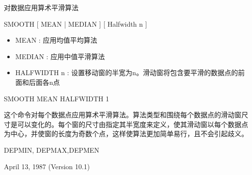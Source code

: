 \label{cmd:smooth}

对数据应用算术平滑算法

SMOOTH [ MEAN | MEDIAN ] [ Halfwidth n ]

\begin{itemize}
\item MEAN : 应用均值平均算法 
\item MEDIAN : 应用中值平滑算法 
\item HALFWIDTH n : 设置移动窗的半宽为n。滑动窗将包含要平滑的数据点的前面和后面各n点 
\end{itemize}

SMOOTH MEAN HALFWIDTH 1

这个命令对每个数据点应用算术平滑算法。算法类型和围绕每个数据点的滑动窗尺寸是可以变化的。每个窗的尺寸由指定其半宽度来定义，使其滑动窗以每个数据点为中心，并使窗的长度为奇数个点，这样使算法更加简单易行，且不会引起歧义。

DEPMIN, DEPMAX,DEPMEN

April 13, 1987 (Version 10.1)
